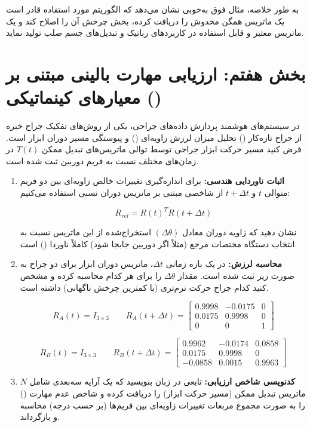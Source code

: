 \documentclass{article}
\begin{document}
به طور خلاصه، مثال فوق به‌خوبی نشان می‌دهد که الگوریتم مورد استفاده قادر است یک ماتریس همگن مخدوش را دریافت کرده، بخش چرخش آن را اصلاح کند و یک ماتریس معتبر و قابل استفاده در کاربردهای رباتیک و تبدیل‌های جسم صلب تولید نماید.

\newpage
\section{بخش هفتم: ارزیابی مهارت بالینی مبتنی بر معیارهای کینماتیکی 
	()}

در سیستم‌های هوشمند پردازش داده‌های جراحی، یکی از روش‌های تفکیک جراح خبره از جراح تازه‌کار 
() تحلیل میزان لرزش زاویه‌ای () و پیوستگی مسیر دوران ابزار است.
فرض کنید مسیر حرکت ابزار جراحی توسط توالی ماتریس‌های تبدیل ممکن $T(t)$ در زمان‌های مختلف
نسبت به فریم دوربین ثبت شده است.

\begin{enumerate}
	\item
	\textbf{اثبات ناوردایی هندسی:}
	برای اندازه‌گیری تغییرات خالص زاویه‌ای بین دو فریم متوالی $t$ و $t+\Delta t$ از شاخصی
	مبتنی بر ماتریس دوران نسبی استفاده می‌کنیم:
	
	\[
	R_{rel} = R(t)^T R(t+\Delta t)
	\]
	
	نشان دهید که زاویه دوران معادل $(\Delta \theta)$ استخراج‌شده از این ماتریس نسبت به انتخاب
	دستگاه مختصات مرجع (مثلاً اگر دوربین جابجا شود) کاملاً ناوردا () است.
	
	\item
	\textbf{محاسبه لرزش:}
	در یک بازه زمانی $\Delta t$، ماتریس دوران ابزار برای دو جراح به صورت زیر ثبت شده است.
	مقدار $\Delta \theta$ را برای هر کدام محاسبه کرده و مشخص کنید کدام جراح حرکت نرم‌تری
	(با کمترین چرخش ناگهانی) داشته است.
	
	\[
	R_A(t) = I_{3\times3}
	\qquad
	R_A(t+\Delta t) =
	\begin{bmatrix}
		0.9998 & -0.0175 & 0 \\
		0.0175 & 0.9998 & 0 \\
		0 & 0 & 1
	\end{bmatrix}
	\]
	
	\[
	R_B(t) = I_{3\times3}
	\qquad
	R_B(t+\Delta t) =
	\begin{bmatrix}
		0.9962 & -0.0174 & 0.0858 \\
		0.0175 & 0.9998 & 0 \\
		-0.0858 & 0.0015 & 0.9963
	\end{bmatrix}
	\]
	
	\item
	\textbf{کدنویسی شاخص ارزیابی:}
	تابعی در زبان  بنویسید که یک آرایه سه‌بعدی شامل $N$ ماتریس تبدیل ممکن
	(مسیر حرکت ابزار) را دریافت کرده و شاخص عدم مهارت () را به صورت
	مجموع مربعات تغییرات زاویه‌ای بین فریم‌ها (بر حسب درجه) محاسبه و بازگرداند.
\end{enumerate}
\end{document}

